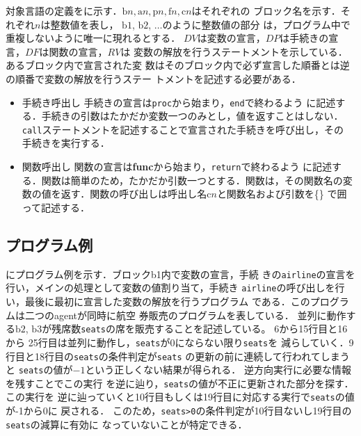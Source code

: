 \documentclass[submit,PRO]{ipsj}
\newcommand{\blabel}[1]{\mathrm{b}#1}
\newcommand{\plabel}[1]{\mathrm{p}#1}
\newcommand{\clabel}[1]{\mathrm{c}#1}
\newcommand{\flabel}[1]{\mathrm{f}#1}
\newcommand{\alabel}[1]{\mathrm{a}#1}
\begin{document}
対象言語の定義をに示す．$\blabel{n}, \alabel{n}, \plabel{n}, \flabel{n}, \clabel{n}$はそれぞれの
ブロック名を示す．それぞれ$n$は整数値を表し，%
$\blabel{1}$, $\blabel{2}$, $\ldots$のように整数値の部分%
は，プログラム中で重複しないように唯一に現れるとする．%
$DV$は変数の宣言，$DP$は手続きの宣言，$DF$は関数の宣言，$RV$は%
変数の解放を行うステートメントを示している．あるブロック内で宣言された変
数はそのブロック内で必ず宣言した順番とは逆の順番で変数の解放を行うステー
トメントを記述する必要がある．

\begin{itemize}
\item
手続き呼出し 手続きの宣言は\texttt{proc}から始まり，\texttt{end}で終わるよう
     に記述する．手続きの引数はたかだか変数一つのみとし，値を返すことはしない．
     \texttt{call}ステートメントを記述することで宣言された手続きを呼び出し，その
     手続きを実行する．
\item
関数呼出し 関数の宣言は{\bf func}から始まり，\texttt{return}で終わるよう
     に記述する．関数は簡単のため，たかだか引数一つとする．関数は，その関数名の変数の値を返す．関数の呼び出しは呼出し名$\clabel{n}$と関数名および引数を\{\}
     で囲って記述する．
\end{itemize}

\subsection{プログラム例}

にプログラム例を示す．ブロックb1内で変数の宣言，手続
きの\verb:airline:の宣言を行い，メインの処理として変数の値割り当て，手続き
\verb:airline:の呼び出しを行い，最後に最初に宣言した変数の解放を行うプログラム
である．このプログラムは二つのagentが同時に航空
券販売のプログラムを表している．
並列に動作する$\blabel{2}$, $\blabel{3}$が残席数\verb:seats:の席を販売することを記述している。
6から15行目と16から
25行目は並列に動作し，\verb;seats;が0にならない限り\verb;seats;を
減らしていく．9行目と18行目の\verb;seats;の条件判定が\verb;seats;
の更新の前に連続して行われてしまうと
\verb;seats;の値が$-1$という正しくない結果が得られる．
逆方向実行に必要な情報を残すことでこの実行
を逆に辿り，\verb;seats;の値が不正に更新された部分を探す．この実行を
逆に辿っていくと10行目もしくは19行目に対応する実行で\verb;seats;の値が-1から0に
戻される．
このため，\verb|seats>0|の条件判定が10行目ないし19行目の\verb|seats|の減算に有効に
なっていないことが特定できる．
\end{document}
